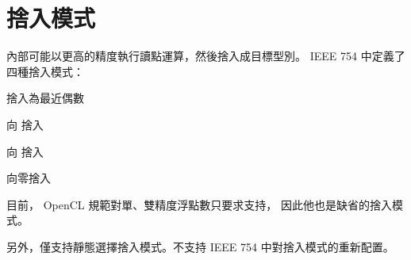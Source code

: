\section[section:roundingMode]{捨入模式}

內部可能以更高的精度執行讀點運算，然後捨入成目標型別。
IEEE 754 中定義了四種捨入模式：
\startigBase
\item 捨入為最近偶數
\item 向 \math{+\infty} 捨入
\item 向 \math{-\infty} 捨入
\item 向零捨入
\stopigBase

目前， OpenCL 規範對單、雙精度浮點數只要求支持{}，
因此他也是缺省的捨入模式。

另外，僅支持靜態選擇捨入模式。不支持 IEEE 754 中對捨入模式的重新配置。
